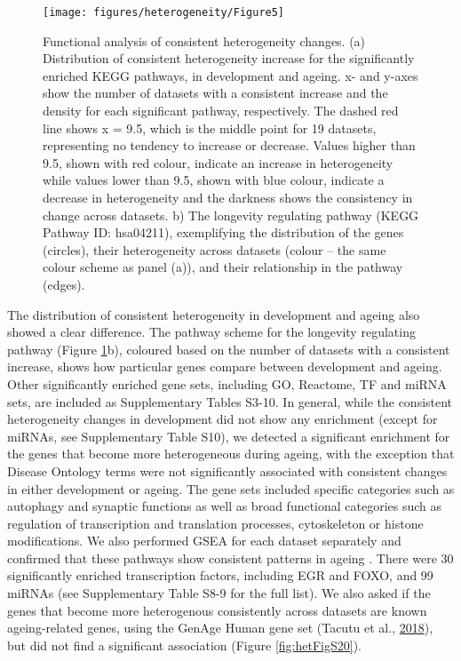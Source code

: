 \documentclass[12pt,twoside]{unicam}
\begin{document}
\begin{figure}

{\centering \texttt{[image: figures/heterogeneity/Figure5]} 

}

\caption[Functional analysis of consistent heterogeneity changes.]{Functional analysis of consistent heterogeneity changes. (a) Distribution of consistent heterogeneity increase for the significantly enriched KEGG pathways, in development and ageing. x- and y-axes show the number of datasets with a consistent increase and the density for each significant pathway, respectively. The dashed red line shows x = 9.5, which is the middle point for 19 datasets, representing no tendency to increase or decrease. Values higher than 9.5, shown with red colour, indicate an increase in heterogeneity while values lower than 9.5, shown with blue colour, indicate a decrease in heterogeneity and the darkness shows the consistency in change across datasets. b) The longevity regulating pathway (KEGG Pathway ID: hsa04211), exemplifying the distribution of the genes (circles), their heterogeneity across datasets (colour – the same colour scheme as panel (a)), and their relationship in the pathway (edges).}\label{fig:hetFig5}
\end{figure}

The distribution of consistent heterogeneity in development and ageing also showed a clear difference. The pathway scheme for the longevity regulating pathway (Figure \ref{fig:hetFig5}b), coloured based on the number of datasets with a consistent increase, shows how particular genes compare between development and ageing. Other significantly enriched gene sets, including GO, Reactome, TF and miRNA sets, are included as Supplementary Tables S3-10. In general, while the consistent heterogeneity changes in development did not show any enrichment (except for miRNAs, see Supplementary Table S10), we detected a significant enrichment for the genes that become more heterogeneous during ageing, with the exception that Disease Ontology terms were not significantly associated with consistent changes in either development or ageing. The gene sets included specific categories such as autophagy and synaptic functions as well as broad functional categories such as regulation of transcription and translation processes, cytoskeleton or histone modifications. We also performed GSEA for each dataset separately and confirmed that these pathways show consistent patterns in ageing
. There were 30 significantly enriched transcription factors, including EGR and FOXO, and 99 miRNAs (see Supplementary Table S8-9 for the full list). We also asked if the genes that become more heterogenous consistently across datasets are known ageing-related genes, using the GenAge Human gene set (Tacutu et al., \protect\hyperlink{ref-Tacutu2018}{2018}), but did not find a significant association (Figure \ref{fig:hetFigS20}).
\end{document}

